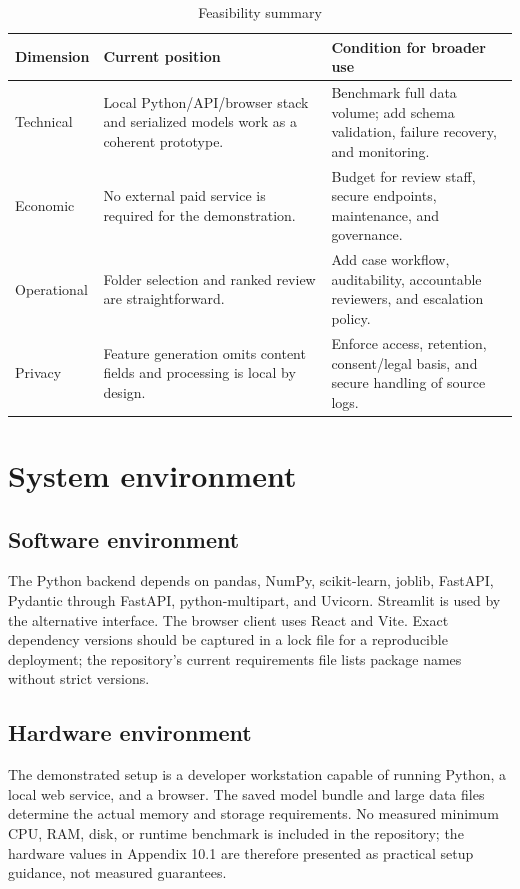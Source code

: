 \documentclass[12pt,a4paper,oneside]{report}
\newcommand{\tablefont}{\small}
\begin{document}
\begin{table}[H]
\centering
\tablefont
\caption{Feasibility summary}
\label{tab:feasibility}
\begin{tabularx}{\textwidth}{|p{}|Y|Y|}
\hline
\textbf{Dimension} & \textbf{Current position} & \textbf{Condition for broader use}\\\hline
Technical & Local Python/API/browser stack and serialized models work as a coherent prototype. & Benchmark full data volume; add schema validation, failure recovery, and monitoring.\\\hline
Economic & No external paid service is required for the demonstration. & Budget for review staff, secure endpoints, maintenance, and governance.\\\hline
Operational & Folder selection and ranked review are straightforward. & Add case workflow, auditability, accountable reviewers, and escalation policy.\\\hline
Privacy & Feature generation omits content fields and processing is local by design. & Enforce access, retention, consent/legal basis, and secure handling of source logs.\\\hline
\end{tabularx}
\end{table}

\section{System environment}

\subsection{Software environment}
The Python backend depends on pandas, NumPy, scikit-learn, joblib,
FastAPI, Pydantic through FastAPI, python-multipart, and Uvicorn.
Streamlit is used by the alternative interface. The browser client
uses React and Vite. Exact dependency versions should be captured in a
lock file for a reproducible deployment; the repository's current
requirements file lists package names without strict versions.

\subsection{Hardware environment}
The demonstrated setup is a developer workstation capable of running
Python, a local web service, and a browser. The saved model bundle and
large data files determine the actual memory and storage requirements.
No measured minimum CPU, RAM, disk, or runtime benchmark is included in
the repository; the hardware values in Appendix 10.1 are therefore
presented as practical setup guidance, not measured guarantees.
\end{document}
